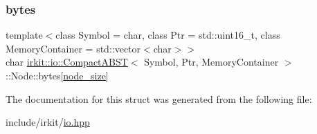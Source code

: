 \subsubsection{\texorpdfstring{bytes}{bytes}}
{\footnotesize\ttfamily template$<$class Symbol = char, class Ptr = std\+::uint16\+\_\+t, class Memory\+Container = std\+::vector$<$char$>$$>$ \\
char \mbox{\hyperlink{classirkit_1_1io_1_1CompactABST}{irkit\+::io\+::\+Compact\+A\+B\+ST}}$<$ Symbol, Ptr, Memory\+Container $>$\+::Node\+::bytes\mbox{[}\mbox{\hyperlink{classirkit_1_1io_1_1CompactABST_ada82da5e8d33fc09b71a0610d14ddaef}{node\+\_\+size}}\mbox{]}}



The documentation for this struct was generated from the following file\+:\begin{DoxyCompactItemize}
\item 
include/irkit/\mbox{\hyperlink{io_8hpp}{io.\+hpp}}\end{DoxyCompactItemize}
